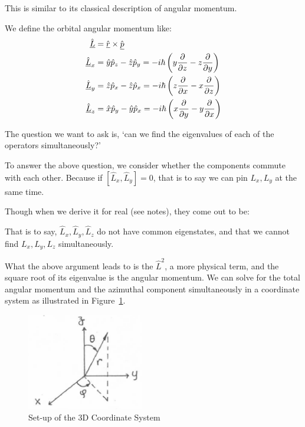 \documentclass{school-22.101-notes}
\begin{document}
This is similar to its classical description of angular momentum. 

We define the orbital angular momentum like:
\begin{align}
\hat{\underline{L}} &= \hat{\underline{r}} \times \hat{\underline{p}} \\
\hat{\underline{L}}_x &= \hat{y} \hat{p}_z - \hat{z} \hat{p}_y = - i\hbar \left( y \frac{\partial}{\partial z} - z \frac{\partial}{\partial y} \right) \\
\hat{\underline{L}}_y &= \hat{z} \hat{p}_x - \hat{z} \hat{p}_x = - i\hbar \left( z \frac{\partial}{\partial x} - x \frac{\partial}{\partial z} \right) \\
\hat{\underline{L}}_z &= \hat{x} \hat{p}_y - \hat{y} \hat{p}_x = - i\hbar \left( x \frac{\partial}{\partial y} - y \frac{\partial}{\partial x} \right) 
\end{align}

The question we want to ask is, `can we find the eigenvalues of each of the operators simultaneously?'

To answer the above question, we consider whether the components commute with each other. Because if $\left[ \hat{L}_x, \hat{L}_y \right] = 0$, that is to say we can pin $L_x, L_y$ at the same time. 

Though when we derive it for real (see notes), they come out to be:

That is to say, $\hat{L}_x, \hat{L}_y, \hat{L}_z$ do not have common eigenstates, and that we cannot find $L_x, L_y, L_z$ simultaneously. 

What the above argument leads to is the $\hat{L}^2$,  a more physical term, and the square root of its eigenvalue is the angular momentum. 
We can solve for the total angular momentum and the azimuthal component simultaneously in a coordinate system as illustrated in Figure~\ref{3DCS}. 
\begin{figure}
    \centering
    \includegraphics[width=2in]{images/qm/3DCS.png}
    \caption{Set-up of the 3D Coordinate System\label{3DCS}}
\end{figure}
\end{document}
